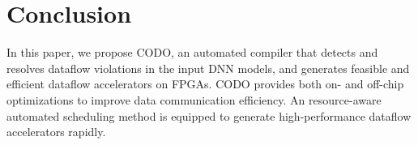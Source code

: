 \documentclass[conference]{IEEEtran}
\begin{document}



\vspace{-0.1cm}
\section{Conclusion}
\vspace{-0.1cm}
In this paper, we propose CODO, an automated compiler that detects and resolves dataflow violations in the input DNN models, and generates feasible and efficient dataflow accelerators on FPGAs. CODO provides both on- and off-chip optimizations to improve data communication efficiency. An resource-aware automated scheduling method is equipped to generate high-performance dataflow accelerators rapidly. 
\end{document}
